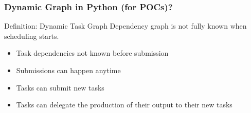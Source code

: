 
\begin{frame}
	\frametitle{Dynamic Graph in Python (for POCs)?}
	\begin{block}{Definition: Dynamic Task Graph}
		Dependency graph is not fully known when scheduling starts.
	\end{block}
	\begin{itemize}
		\item Task dependencies not known before submission
		\item Submissions can happen anytime
		\item Tasks can submit new tasks
		\item Tasks can delegate the production of their output to their new tasks
	\end{itemize}
	\small
	\inputminted{python}{subtasking.py}
\end{frame}

